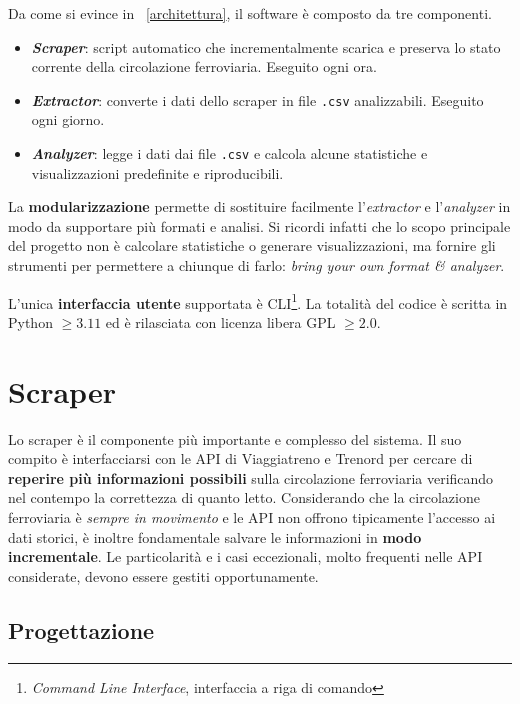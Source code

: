 \documentclass[12pt,italian]{report}
\begin{document}
Da come si evince in \figurename\ \ref{architettura}, il software è
composto da tre componenti.
\begin{itemize}
    \item \textbf{\textit{Scraper}}: script automatico che
    incrementalmente scarica e preserva lo stato corrente della
    circolazione ferroviaria.  Eseguito ogni ora.
    \item \textbf{\textit{Extractor}}: converte i dati dello scraper
    in file \texttt{.csv} analizzabili.  Eseguito ogni giorno.
    \item \textbf{\textit{Analyzer}}: legge i dati dai file
    \texttt{.csv} e calcola alcune statistiche e visualizzazioni
    predefinite e riproducibili.
\end{itemize}

La \textbf{modularizzazione} permette di sostituire facilmente
l'\textit{extractor} e l'\textit{analyzer} in modo da supportare più
formati e analisi.  Si ricordi infatti che lo scopo principale del
progetto non è calcolare statistiche o generare visualizzazioni, ma
fornire gli strumenti per permettere a chiunque di farlo:
\textit{bring your own format \& analyzer}.

L'unica \textbf{interfaccia utente} supportata è
CLI\footnote{\textit{Command Line Interface}, interfaccia a riga di
    comando}.  La totalità del codice è scritta in Python $\geq 3.11$
ed è rilasciata con licenza libera GPL $\geq 2.0$.

\section{Scraper}

Lo scraper è il componente più importante e complesso del sistema.  Il
suo compito è interfacciarsi con le API di Viaggiatreno e Trenord per
cercare di \textbf{reperire più informazioni possibili} sulla
circolazione ferroviaria verificando nel contempo la correttezza di
quanto letto.  Considerando che la circolazione ferroviaria è
\textit{sempre in movimento} e le API non offrono tipicamente
l'accesso ai dati storici, è inoltre fondamentale salvare le
informazioni in \textbf{modo incrementale}.  Le particolarità e i casi
eccezionali, molto frequenti nelle API considerate, devono essere
gestiti opportunamente.

\subsection{Progettazione}
\end{document}
